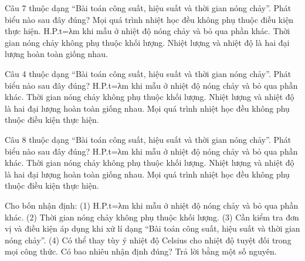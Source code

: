 \begin{ex}
Câu 7 thuộc dạng “Bài toán công suất, hiệu suất và thời gian nóng chảy”. Phát biểu nào sau đây đúng?
\choice
{Mọi quá trình nhiệt học đều không phụ thuộc điều kiện thực hiện.}
{\True H.P.t=λm khi mẫu ở nhiệt độ nóng chảy và bỏ qua phần khác.}
{Thời gian nóng chảy không phụ thuộc khối lượng.}
{Nhiệt lượng và nhiệt độ là hai đại lượng hoàn toàn giống nhau.}
\end{ex}

\begin{ex}
Câu 4 thuộc dạng “Bài toán công suất, hiệu suất và thời gian nóng chảy”. Phát biểu nào sau đây đúng?
\choice
{\True H.P.t=λm khi mẫu ở nhiệt độ nóng chảy và bỏ qua phần khác.}
{Thời gian nóng chảy không phụ thuộc khối lượng.}
{Nhiệt lượng và nhiệt độ là hai đại lượng hoàn toàn giống nhau.}
{Mọi quá trình nhiệt học đều không phụ thuộc điều kiện thực hiện.}
\end{ex}

\begin{ex}
Câu 8 thuộc dạng “Bài toán công suất, hiệu suất và thời gian nóng chảy”. Phát biểu nào sau đây đúng?
\choice
{\True H.P.t=λm khi mẫu ở nhiệt độ nóng chảy và bỏ qua phần khác.}
{Thời gian nóng chảy không phụ thuộc khối lượng.}
{Nhiệt lượng và nhiệt độ là hai đại lượng hoàn toàn giống nhau.}
{Mọi quá trình nhiệt học đều không phụ thuộc điều kiện thực hiện.}
\end{ex}

\begin{ex}
Cho bốn nhận định: (1) H.P.t=λm khi mẫu ở nhiệt độ nóng chảy và bỏ qua phần khác. (2) Thời gian nóng chảy không phụ thuộc khối lượng. (3) Cần kiểm tra đơn vị và điều kiện áp dụng khi xử lí dạng “Bài toán công suất, hiệu suất và thời gian nóng chảy”. (4) Có thể thay tùy ý nhiệt độ Celsius cho nhiệt độ tuyệt đối trong mọi công thức. Có bao nhiêu nhận định đúng? Trả lời bằng một số nguyên.
\end{ex}

